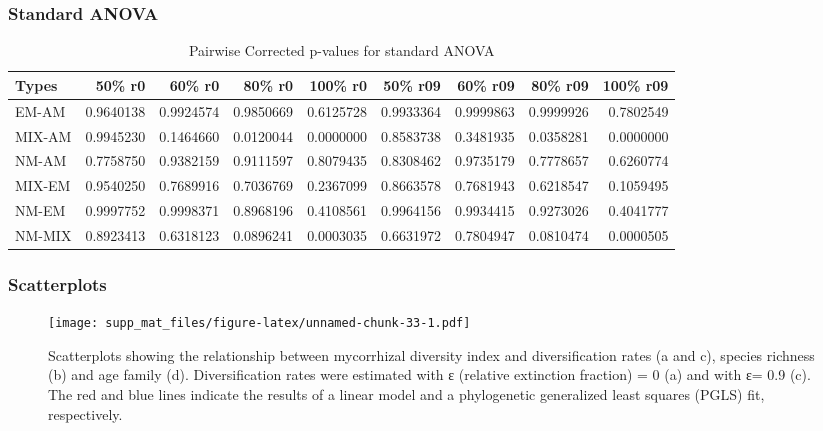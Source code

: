 \documentclass[]{article}
\begin{document}
\hypertarget{standard-anova-5}{%
\subsubsection{Standard ANOVA}\label{standard-anova-5}}

\begin{table}[H]

\caption{\label{tab:unnamed-chunk-32}Pairwise Corrected p-values for standard ANOVA}
\centering
\begin{tabular}{l|r|r|r|r|r|r|r|r}
\hline
Types & 50\% r0 & 60\% r0 & 80\% r0 & 100\% r0 & 50\% r09 & 60\% r09 & 80\% r09 & 100\% r09\\
\hline
EM-AM & 0.9640138 & 0.9924574 & 0.9850669 & 0.6125728 & 0.9933364 & 0.9999863 & 0.9999926 & 0.7802549\\
\hline
MIX-AM & 0.9945230 & 0.1464660 & 0.0120044 & 0.0000000 & 0.8583738 & 0.3481935 & 0.0358281 & 0.0000000\\
\hline
NM-AM & 0.7758750 & 0.9382159 & 0.9111597 & 0.8079435 & 0.8308462 & 0.9735179 & 0.7778657 & 0.6260774\\
\hline
MIX-EM & 0.9540250 & 0.7689916 & 0.7036769 & 0.2367099 & 0.8663578 & 0.7681943 & 0.6218547 & 0.1059495\\
\hline
NM-EM & 0.9997752 & 0.9998371 & 0.8968196 & 0.4108561 & 0.9964156 & 0.9934415 & 0.9273026 & 0.4041777\\
\hline
NM-MIX & 0.8923413 & 0.6318123 & 0.0896241 & 0.0003035 & 0.6631972 & 0.7804947 & 0.0810474 & 0.0000505\\
\hline
\end{tabular}
\end{table}

\hypertarget{scatterplots-1}{%
\subsubsection{Scatterplots}\label{scatterplots-1}}

\begin{figure}
\centering
\texttt{[image: supp\_mat\_files/figure-latex/unnamed-chunk-33-1.pdf]}
\caption{Scatterplots showing the relationship between mycorrhizal
diversity index and diversification rates (a and c), species richness
(b) and age family (d). Diversification rates were estimated with ε
(relative extinction fraction) = 0 (a) and with ε= 0.9 (c). The red and
blue lines indicate the results of a linear model and a phylogenetic
generalized least squares (PGLS) fit, respectively.}
\end{figure}
\end{document}
